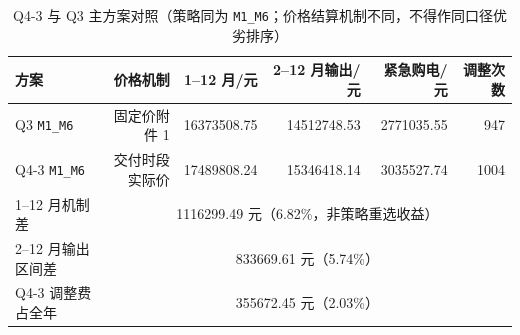 \begin{table}[htbp]
\centering
\caption{Q4-3 与 Q3 主方案对照（策略同为 \texttt{M1\_M6}；价格结算机制不同，不得作同口径优劣排序）}\label{tab:q4-3-mechanism-compare}
\small\setlength{\tabcolsep}{3pt}
\begin{tabular}{@{}lrrrrr@{}}
\toprule
方案 & 价格机制 & 1--12 月/元 & 2--12 月输出/元 & 紧急购电/元 & 调整次数 \\
\midrule
Q3 \texttt{M1\_M6} & 固定价附件 1 & 16373508.75 & 14512748.53 & 2771035.55 & 947 \\
Q4-3 \texttt{M1\_M6} & 交付时段实际价 & 17489808.24 & 15346418.14 & 3035527.74 & 1004 \\
\midrule
1--12 月机制差 & \multicolumn{5}{c}{1116299.49 元（6.82\%，非策略重选收益）} \\
2--12 月输出区间差 & \multicolumn{5}{c}{833669.61 元（5.74\%）} \\
Q4-3 调整费占全年 & \multicolumn{5}{c}{355672.45 元（2.03\%）} \\
\bottomrule
\end{tabular}
\end{table}
